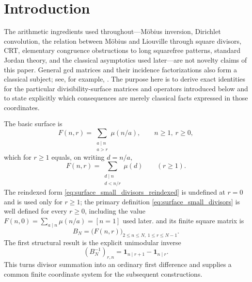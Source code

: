 \documentclass[11pt]{amsart}
\numberwithin{equation}{section}
\theoremstyle{plain}
\theoremstyle{definition}
\theoremstyle{remark}
\newcommand{\one}{\mathbf 1}
\newcommand{\mob}{\mu}
\newcommand{\Fsurf}{F}
\begin{document}
\maketitle
\tableofcontents
\bigskip

\section{Introduction}
\label{sec:introduction}

The arithmetic ingredients used throughout---Möbius inversion, Dirichlet convolution, the relation between Möbius and Liouville through square divisors, CRT, elementary congruence obstructions to long squarefree patterns, standard Jordan theory, and the classical asymptotics used later---are not novelty claims of this paper.  General gcd matrices and their incidence factorizations also form a classical subject; see, for example, \cite{Bhat1991}.  The purpose here is to derive exact identities for the particular divisibility-surface matrices and operators introduced below and to state explicitly which consequences are merely classical facts expressed in those coordinates.

The basic surface is
\begin{equation}
\Fsurf(n,r)=\sum_{\substack{a\mid n\\a>r}}\mob(n/a),
\qquad n\ge1,\ r\ge0,
\label{eq:surface_small_divisors}
\end{equation}
which for $r\ge1$ equals, on writing $d=n/a$,
\begin{equation}
\Fsurf(n,r)=\sum_{\substack{d\mid n\\d<n/r}}\mob(d)
\qquad(r\ge1).
\label{eq:surface_small_divisors_reindexed}
\end{equation}
The reindexed form \eqref{eq:surface_small_divisors_reindexed} is undefined at $r=0$ and is used only for $r\ge1$; the primary definition \eqref{eq:surface_small_divisors} is well defined for every $r\ge0$, including the value $\Fsurf(n,0)=\sum_{a\mid n}\mob(n/a)=[n=1]$ used later.
and its finite square matrix is
\begin{equation}
B_N=\bigl(\Fsurf(n,r)\bigr)_{2\le n\le N,\ 1\le r\le N-1}.
\label{eq:BN_intro}
\end{equation}
The first structural result is the explicit unimodular inverse
\begin{equation}
(B_N^{-1})_{r,n}=\one_{n\mid r+1}-\one_{n\mid r}.
\label{eq:BN_inverse_intro}
\end{equation}
This turns divisor summation into an ordinary first difference and supplies a common finite coordinate system for the subsequent constructions.
\end{document}
